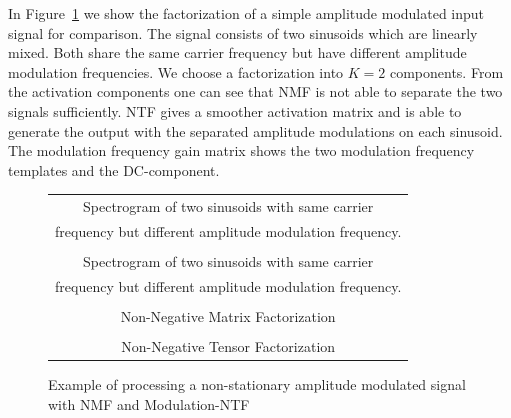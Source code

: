 In Figure~\ref{fig:tensor} we show the factorization of a simple amplitude modulated input signal for comparison. The signal consists of two sinusoids which are linearly mixed. Both share the same carrier frequency but have different amplitude modulation frequencies. We choose a factorization into $K=2$ components. From the activation components one can see that NMF is not able to separate the two signals sufficiently. NTF gives a smoother activation matrix and is able to generate the output with the separated amplitude modulations on each sinusoid. The modulation frequency gain matrix shows the two modulation frequency templates and the DC-component.

\begin{figure}[H]
\begin{center}
\begin{tabular}{c}
	\\
   Spectrogram of two sinusoids with same carrier\\
   frequency but different amplitude modulation frequency.\\[6pt]
	 \\
    Spectrogram of two sinusoids with same carrier\\
    frequency but different amplitude modulation frequency.\\[6pt]
	 \\
    Non-Negative Matrix Factorization \\[6pt]
	 \\
    Non-Negative Tensor Factorization\\[6pt]
\end{tabular}
\caption{Example of processing a non-stationary amplitude modulated signal with NMF and Modulation-NTF}
\label{fig:tensor}
\end{center}
\end{figure}

